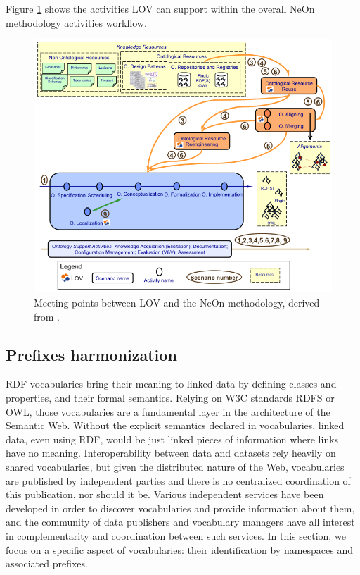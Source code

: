 Figure \ref{fig:LOVandNeOn} shows the activities LOV can support within the overall NeOn methodology activities workflow.
\begin{figure}[h!tp]
\centering
  \includegraphics[width=.80\linewidth]{img/neonScenarios.png}
  \caption{Meeting points between LOV and the NeOn methodology, derived from \cite{MC10}.}
  \label{fig:LOVandNeOn}
\end{figure}

\subsection{Prefixes harmonization}
\label{sec:prefharmoni}

RDF vocabularies bring their meaning to linked data by defining classes and properties, and their formal semantics. Relying on W3C standards RDFS or OWL, those vocabularies are a fundamental layer in the architecture of the Semantic Web. Without the explicit semantics declared in vocabularies, linked data, even using RDF, would be just linked pieces of information where links have no meaning. Interoperability between data and datasets rely heavily on shared vocabularies, but given the distributed nature of the Web, vocabularies are published by independent parties and there is no centralized coordination of this publication, nor should it be. Various independent services have been developed in order to discover vocabularies and provide information about them, and the community of data publishers and vocabulary managers have all interest in complementarity and coordination between such services. In this section, we focus on a specific aspect of vocabularies: their identification by namespaces and associated prefixes.

